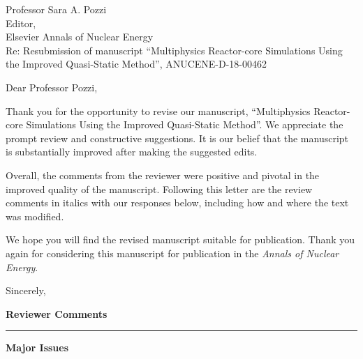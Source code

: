 \documentclass[11pt]{letter}
\newcommand{\section}[1]{\textbf{#1}}
\begin{document}

\begin{letter}{Professor Sara A. Pozzi\\
    Editor,\\
    Elsevier Annals of Nuclear Energy\\
    \bigskip
    Re: Resubmission of manuscript ``Multiphysics Reactor-core Simulations Using the Improved Quasi-Static Method'', ANUCENE-D-18-00462}
\date{\today}

\opening{Dear Professor Pozzi,}
         \vspace{0.25cm}

Thank you for the opportunity to revise our manuscript, ``Multiphysics Reactor-core Simulations Using the Improved Quasi-Static Method''. We appreciate the prompt review and constructive suggestions. It is our belief that the manuscript is substantially improved after making the suggested edits.

Overall, the comments from the reviewer were positive and pivotal in the improved quality of the manuscript. Following this letter are the review comments in italics with our responses below, including how and where the text was modified.

We hope you will find the revised manuscript suitable for publication. Thank you again for considering this manuscript for publication in the {\it Annals of Nuclear Energy}.

\vspace{0.25cm}



\closing{Sincerely, }

\end{letter}

\large{\textbf{Reviewer Comments}}\hrule\small

\section{Major Issues}
\end{document}
